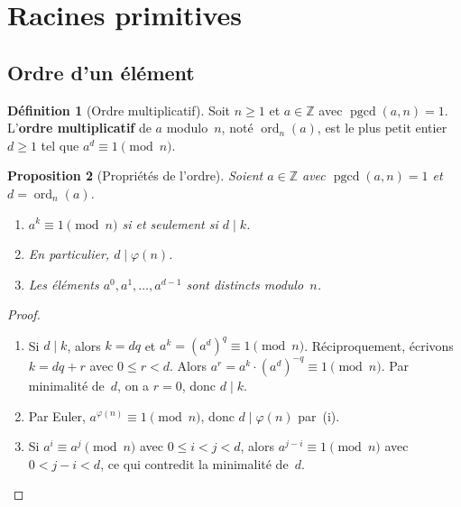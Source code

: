 \documentclass[12pt,a4paper,openany]{book}
\theoremstyle{definition}
\newtheorem{definition}{Définition}[chapter]
\theoremstyle{plain}
\newtheorem{proposition}[definition]{Proposition}
\theoremstyle{remark}
\newcommand{\Z}{\mathbb{Z}}
\DeclareMathOperator{\pgcd}{pgcd}
\DeclareMathOperator{\ord}{ord}
\begin{document}
\section{Racines primitives}
\label{sec:racines-prim}

\subsection{Ordre d'un élément}
\label{subsec:ordre-elt}

\begin{definition}[Ordre multiplicatif]
\label{def:ordre-mult}
Soit $n \geqslant 1$ et $a \in \Z$ avec $\pgcd(a, n) = 1$. L'\textbf{ordre
multiplicatif} de $a$ modulo~$n$, noté
$\ord_n(a)$\index{$\ord_n(a)$}, est le plus petit entier $d \geqslant 1$ tel que
$a^d \equiv 1 \pmod{n}$.
\end{definition}

\begin{proposition}[Propriétés de l'ordre]
\label{prop:ordre-props}
Soient $a \in \Z$ avec $\pgcd(a, n) = 1$ et $d = \ord_n(a)$.
\begin{enumerate}[label=(\roman*)]
  \item $a^k \equiv 1 \pmod{n}$ si et seulement si $d \mid k$.
  \item En particulier, $d \mid \varphi(n)$.
  \item Les éléments $a^0, a^1, \ldots, a^{d-1}$ sont distincts modulo~$n$.
\end{enumerate}
\end{proposition}

\begin{proof}
\leavevmode
\begin{enumerate}[label=(\roman*)]
  \item Si $d \mid k$, alors $k = dq$ et $a^k = (a^d)^q \equiv 1 \pmod{n}$.
    Réciproquement, écrivons $k = dq + r$ avec $0 \leqslant r < d$. Alors
    $a^r = a^k \cdot (a^d)^{-q} \equiv 1 \pmod{n}$. Par minimalité de~$d$,
    on a $r = 0$, donc $d \mid k$.
  \item Par Euler, $a^{\varphi(n)} \equiv 1 \pmod{n}$, donc $d \mid \varphi(n)$
    par~(i).
  \item Si $a^i \equiv a^j \pmod{n}$ avec $0 \leqslant i < j < d$, alors
    $a^{j-i} \equiv 1 \pmod{n}$ avec $0 < j - i < d$, ce qui contredit la
    minimalité de~$d$.
    \qedhere
\end{enumerate}
\end{proof}
\end{document}
